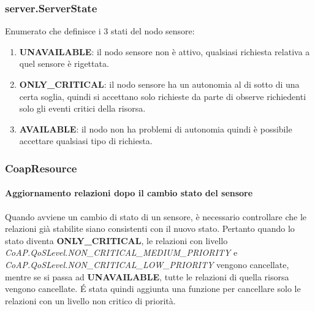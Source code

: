 			\subsubsection{server.ServerState}
				Enumerato che definisce i 3 stati del nodo sensore:
				\begin{enumerate}
					\item \textbf{UNAVAILABLE}: il nodo sensore non è attivo, qualsiasi richiesta relativa a quel sensore è rigettata.
					\item \textbf{ONLY\_CRITICAL}: il nodo sensore ha un autonomia al di sotto di una certa soglia, quindi si accettano solo richieste da parte di observe richiedenti solo gli eventi critici della risorsa.
					\item \textbf{AVAILABLE}: il nodo non ha problemi di autonomia quindi è possibile accettare qualsiasi tipo di richiesta.
				\end{enumerate}
				

			\subsubsection{CoapResource}
				\paragraph{Aggiornamento relazioni dopo il cambio stato del sensore}\label{cambioStatoSensore}
				Quando avviene un cambio di stato di un sensore, è necessario controllare che le relazioni già stabilite siano consistenti con il nuovo stato. Pertanto quando lo stato diventa \textbf{ONLY\_CRITICAL}, le relazioni con livello \textit{CoAP.QoSLevel.NON\_CRITICAL\_MEDIUM\_PRIORITY} e \textit{CoAP.QoSLevel.NON\_CRITICAL\_LOW\_PRIORITY} vengono cancellate, mentre se si passa ad \textbf{UNAVAILABLE}, tutte le relazioni di quella risorsa vengono cancellate. \'E stata quindi aggiunta una funzione per cancellare solo le relazioni con un livello non critico di priorità. \newline
				
